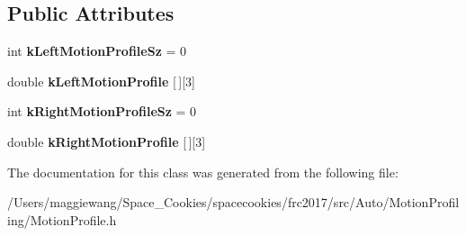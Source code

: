 \subsection*{Public Attributes}
\begin{DoxyCompactItemize}
\item 
\mbox{\label{class_motion_profile_a4b8366ff0f33d91d9a427bd93b7ceb69}} 
int {\bfseries k\+Left\+Motion\+Profile\+Sz} = 0
\item 
\mbox{\label{class_motion_profile_a9c911a0a62025c5541d85e066666dd4c}} 
double {\bfseries k\+Left\+Motion\+Profile} \mbox{[}$\,$\mbox{]}\mbox{[}3\mbox{]}
\item 
\mbox{\label{class_motion_profile_a73adb65b3ef772ab29d21774f572044b}} 
int {\bfseries k\+Right\+Motion\+Profile\+Sz} = 0
\item 
\mbox{\label{class_motion_profile_ad5cd0bbcee9e5b9bf77610142df879c5}} 
double {\bfseries k\+Right\+Motion\+Profile} \mbox{[}$\,$\mbox{]}\mbox{[}3\mbox{]}
\end{DoxyCompactItemize}


The documentation for this class was generated from the following file\+:\begin{DoxyCompactItemize}
\item 
/\+Users/maggiewang/\+Space\+\_\+\+Cookies/spacecookies/frc2017/src/\+Auto/\+Motion\+Profiling/Motion\+Profile.\+h\end{DoxyCompactItemize}
